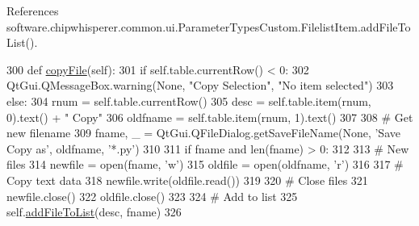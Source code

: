 References software.\+chipwhisperer.\+common.\+ui.\+Parameter\+Types\+Custom.\+Filelist\+Item.\+add\+File\+To\+List().


\begin{DoxyCode}
300     \textcolor{keyword}{def }\hyperlink{classsoftware_1_1chipwhisperer_1_1common_1_1ui_1_1ParameterTypesCustom_1_1FilelistItem_ad5c94c3131dfeb4d1d78818aebc3e929}{copyFile}(self):
301         \textcolor{keywordflow}{if} self.table.currentRow() < 0:
302             QtGui.QMessageBox.warning(\textcolor{keywordtype}{None}, \textcolor{stringliteral}{"Copy Selection"}, \textcolor{stringliteral}{"No item selected"})
303         \textcolor{keywordflow}{else}:
304             rnum = self.table.currentRow()
305             desc = self.table.item(rnum, 0).text() + \textcolor{stringliteral}{" Copy"}
306             oldfname = self.table.item(rnum, 1).text()
307 
308             \textcolor{comment}{# Get new filename}
309             fname, \_ = QtGui.QFileDialog.getSaveFileName(\textcolor{keywordtype}{None}, \textcolor{stringliteral}{'Save Copy as'}, oldfname, \textcolor{stringliteral}{'*.py'})
310 
311             \textcolor{keywordflow}{if} fname \textcolor{keywordflow}{and} len(fname) > 0:
312 
313                 \textcolor{comment}{# New files}
314                 newfile = open(fname, \textcolor{stringliteral}{'w'})
315                 oldfile = open(oldfname, \textcolor{stringliteral}{'}\textcolor{stringliteral}{r')}
316 \textcolor{stringliteral}{}
317 \textcolor{stringliteral}{                }\textcolor{comment}{# Copy text data}
318                 newfile.write(oldfile.read())
319 
320                 \textcolor{comment}{# Close files}
321                 newfile.close()
322                 oldfile.close()
323 
324                 \textcolor{comment}{# Add to list}
325                 self.\hyperlink{classsoftware_1_1chipwhisperer_1_1common_1_1ui_1_1ParameterTypesCustom_1_1FilelistItem_a3eace9967afc91daac3b0786c178b71b}{addFileToList}(desc, fname)
326 
\end{DoxyCode}
\hypertarget{classsoftware_1_1chipwhisperer_1_1common_1_1ui_1_1ParameterTypesCustom_1_1FilelistItem_abb98ce8769757e449861b3fb5e7810a8}{}
